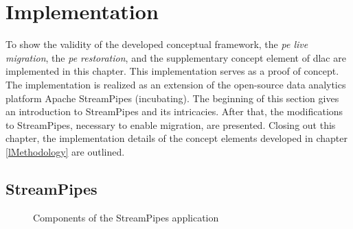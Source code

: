 \section{Implementation}
\label{lImplementation}

To show the validity of the developed conceptual framework, the \textit{\acrshort{pe} live migration}, the \textit{\acrshort{pe} restoration}, and the supplementary concept element of \gls{dlac} are implemented in this chapter. This implementation serves as a proof of concept. The implementation is realized as an extension of the open-source data analytics platform Apache StreamPipes (incubating). The beginning of this section gives an introduction to StreamPipes and its intricacies. After that, the modifications to StreamPipes, necessary to enable migration, are presented. Closing out this chapter, the implementation details of the concept elements developed in chapter \ref{lMethodology} are outlined. 

\subsection{StreamPipes}
\label{lStreamPipes}

\begin{figure}[!b]
    \centering
    \graphicspath{{./figures/code/}}
    
    \caption{Components of the StreamPipes application}
    \label{fStreamPipesSetup}
\end{figure}

